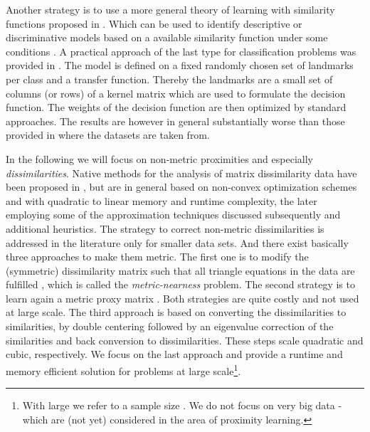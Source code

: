 \documentclass[twoside,11pt]{article}
\begin{document}
Another strategy is to use a more general theory of learning with similarity functions proposed in \cite{DBLP:journals/ml/BalcanBS08}.
Which can be used to identify descriptive or discriminative models based on a available similarity function under some conditions
\cite{DBLP:conf/nips/KarJ12}. A practical approach of the last type for classification problems was provided in \cite{DBLP:conf/nips/KarJ11}. 
The model is defined on a fixed randomly chosen set of landmarks per class and a transfer function. Thereby the landmarks are a small set of columns
(or rows) of a kernel matrix which are used to formulate the decision function. The weights of the decision
function are then optimized by standard approaches. The results are however in general substantially worse than those provided in 
\cite{DBLP:journals/jmlr/ChenGGRC09} where the datasets are taken from.  


In the following we will focus on non-metric proximities and especially \emph{dissimilarities}. Native methods for the analysis of matrix dissimilarity data 
have been proposed in \cite{DBLP:journals/neco/GraepelO99,Pekalska2005a,DBLP:journals/jmlr/PekalskaPD01,Schleif2012k}, but are in general based on non-convex optimization schemes 
and with quadratic to linear memory and runtime complexity, the later employing some of the approximation techniques discussed subsequently 
and additional heuristics. The strategy to correct non-metric dissimilarities is addressed in the literature only for smaller data sets.  And there exist
basically three approaches to make them metric. The first one is to modify the (symmetric) dissimilarity matrix such that all triangle equations
in the data are fulfilled \cite{DBLP:journals/siammax/BrickellDST08}, which is called the \emph{metric-nearness} problem. The second strategy
is to learn again a metric proxy matrix \cite{Lu30082005}. Both strategies are quite costly and not used at large scale. The third approach 
is based on converting the dissimilarities to similarities, by double centering followed by an eigenvalue correction of the similarities and
back conversion to dissimilarities. These steps scale quadratic and cubic, respectively. We focus on the last approach and provide a runtime
and memory efficient solution for problems at large scale\footnote{With large we refer to a sample size . We do not focus
on very big data - which are (not yet) considered in the area of proximity learning.}. 
\end{document}
